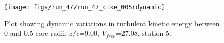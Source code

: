\begin{figure}[H]
\centering
\texttt{[image: figs/run\_47/run\_47\_ctke\_005rdynamic]}
\caption{Plot showing dynamic variations in turbulent kinetic energy between 0 and 0.5 core radii. $z/c$=9.00, $V_{free}$=27.08, station 5.}
\label{fig:run_47_ctke_005rdynamic}
\end{figure}


